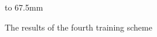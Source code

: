 \begin{figure}[H]
{    }
    \hspace{0mm}
    \hbox to 67.5mm{}%
    \caption{The results of the fourth training scheme}
    \label{fig:training_scheme_4}
\end{figure}

